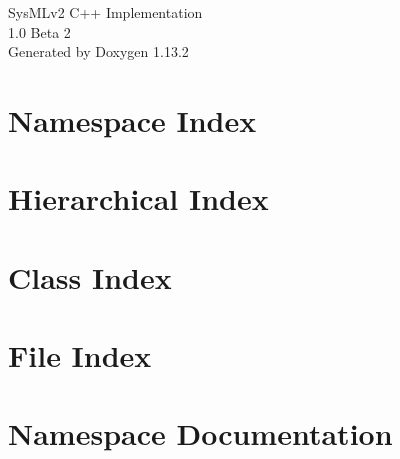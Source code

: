 \documentclass[twoside]{book}
\newcommand{\+}{\discretionary{\mbox{\scriptsize$\hookleftarrow$}}{}{}}
\newcommand{\clearemptydoublepage}{%
    \newpage{\pagestyle{empty}\cleardoublepage}%
  }
\begin{document}
  \raggedbottom
    \hypersetup{pageanchor=false,
                bookmarksnumbered=true,
                pdfencoding=unicode
               }
  \begin{titlepage}
  \vspace*{7cm}
  \begin{center}%
  {\Large Sys\+MLv2 C++ Implementation}\\
  [1ex]\large 1.\+0 Beta 2 \\
  \vspace*{1cm}
  {\large Generated by Doxygen 1.13.2}\\
  \end{center}
  \end{titlepage}
  \clearemptydoublepage
  \tableofcontents
  \clearemptydoublepage
  \hypersetup{pageanchor=true}


\chapter{Namespace Index}

\chapter{Hierarchical Index}

\chapter{Class Index}

\chapter{File Index}

\chapter{Namespace Documentation}








\end{document}
